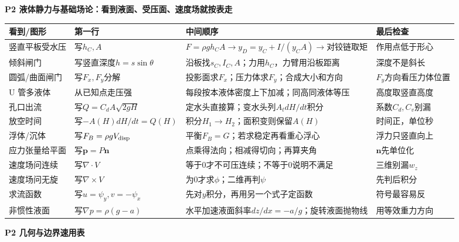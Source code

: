\documentclass[UTF8,a4paper]{ctexart}
\newcommand{\ftitle}[1]{\vspace{1pt}\textbf{\textcolor{B}{#1}}\par\vspace{0.5pt}}
\begin{document}
\ftitle{P2 液体静力与基础场论：看到液面、受压面、速度场就按表走}
\begin{tabular}{|L{0.19\textwidth}|L{0.23\textwidth}|L{0.34\textwidth}|L{0.19\textwidth}|}\hline
\textbf{看到/图形} & \textbf{第一行} & \textbf{中间顺序} & \textbf{最后检查}\\\hline
竖直平板受水压 & 写$h_C,A$ & $F=\rho gh_CA\to y_D=y_C+I/(y_CA)\to$对铰链取矩 & 作用点低于形心 \\\hline
倾斜闸门 & 写竖直深度$h=s\sin\theta$ & 沿板找$s_C,I_C,A$；力用$h_C$，力臂用沿板距离 & 深度不是斜长 \\\hline
圆弧/曲面闸门 & 写$F_x,F_y$分解 & 投影面求$F_x$；压力体求$F_y$；合成大小和方向 & $F_y$方向看压力体位置 \\\hline
U 管多液体 & 从已知点走压强 & 每段按本液体密度上下加减；同高同液体等压 & 高度取竖直高度 \\\hline
孔口出流 & 写$Q=C_dA\sqrt{2gH}$ & 定水头直接算；变水头列$A_t dH/dt$积分 & 系数$C_d,C_v$别漏 \\\hline
放空时间 & 写$-A(H)dH/dt=Q(H)$ & 积分$H_1\to H_2$；面积变则保留$A(H)$ & 时间正，单位秒 \\\hline
浮体/沉体 & 写$F_B=\rho gV_{\rm disp}$ & 平衡$F_B=G$；若求稳定再看重心浮心 & 浮力只竖直向上 \\\hline
应力张量给平面 & 写$\bm p=P\bm n$ & 点乘得法向；相减得切向；再算夹角 & $\bm n$先单位化 \\\hline
速度场问连续 & 写$\nabla\cdot V$ & 等于0才不可压连续；不等于0说明不满足 & 三维别漏$w_z$ \\\hline
速度场问无旋 & 写$\nabla\times V$ & 为0才求$\phi$；二维再判$\psi$ & 先判后积分 \\\hline
求流函数 & 写$u=\psi_y,v=-\psi_x$ & 先对$y$积分，再用另一个式子定函数 & 符号最容易反 \\\hline
非惯性液面 & 写$\nabla p=\rho(g-a)$ & 水平加速液面斜率$dz/dx=-a/g$；旋转液面抛物线 & 用等效重力方向 \\\hline
\end{tabular}
\ftitle{P2 几何与边界速用表}
\end{document}
